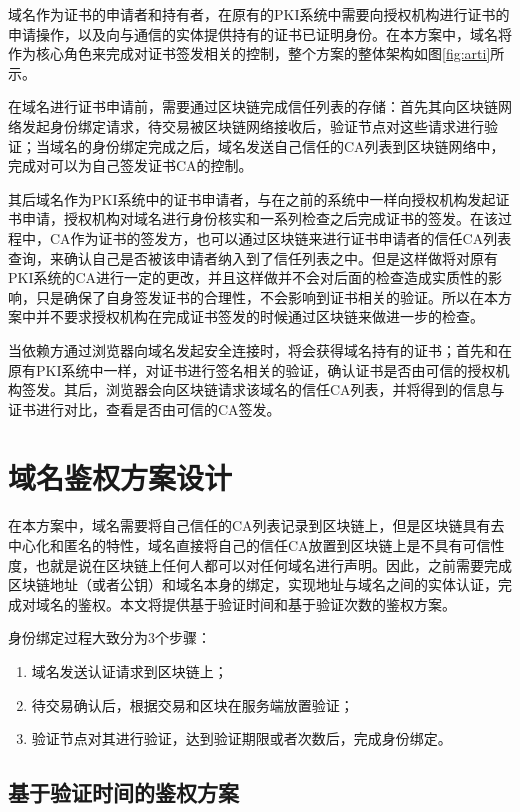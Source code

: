 域名作为证书的申请者和持有者，在原有的PKI系统中需要向授权机构进行证书的申请操作，以及向与通信的实体提供持有的证书已证明身份。在本方案中，域名将作为核心角色来完成对证书签发相关的控制，整个方案的整体架构如图\ref{fig:arti}所示。

在域名进行证书申请前，需要通过区块链完成信任列表的存储：首先其向区块链网络发起身份绑定请求，待交易被区块链网络接收后，验证节点对这些请求进行验证；当域名的身份绑定完成之后，域名发送自己信任的CA列表到区块链网络中，完成对可以为自己签发证书CA的控制。

其后域名作为PKI系统中的证书申请者，与在之前的系统中一样向授权机构发起证书申请，授权机构对域名进行身份核实和一系列检查之后完成证书的签发。在该过程中，CA作为证书的签发方，也可以通过区块链来进行证书申请者的信任CA列表查询，来确认自己是否被该申请者纳入到了信任列表之中。但是这样做将对原有PKI系统的CA进行一定的更改，并且这样做并不会对后面的检查造成实质性的影响，只是确保了自身签发证书的合理性，不会影响到证书相关的验证。所以在本方案中并不要求授权机构在完成证书签发的时候通过区块链来做进一步的检查。

当依赖方通过浏览器向域名发起安全连接时，将会获得域名持有的证书；首先和在原有PKI系统中一样，对证书进行签名相关的验证，确认证书是否由可信的授权机构签发。其后，浏览器会向区块链请求该域名的信任CA列表，并将得到的信息与证书进行对比，查看是否由可信的CA签发。


\section{域名鉴权方案设计}

在本方案中，域名需要将自己信任的CA列表记录到区块链上，但是区块链具有去中心化和匿名的特性，域名直接将自己的信任CA放置到区块链上是不具有可信性度，也就是说在区块链上任何人都可以对任何域名进行声明。因此，之前需要完成区块链地址（或者公钥）和域名本身的绑定，实现地址与域名之间的实体认证，完成对域名的鉴权。本文将提供基于验证时间和基于验证次数的鉴权方案。

身份绑定过程大致分为3个步骤：

\begin{enumerate}
	\item 域名发送认证请求到区块链上；
	\item 待交易确认后，根据交易和区块在服务端放置验证；
	\item 验证节点对其进行验证，达到验证期限或者次数后，完成身份绑定。
\end{enumerate}

\subsection{基于验证时间的鉴权方案}

